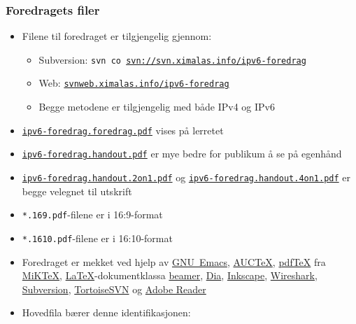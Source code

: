 \begin{frame}[allowframebreaks]
  \frametitle{Foredragets filer}
  \begin{itemize}
  \item Filene til foredraget er tilgjengelig gjennom:
    \begin{itemize}
    \item Subversion: \texttt{svn co
        \url{svn://svn.ximalas.info/ipv6-foredrag}}
    \item Web:
      \href{http://svnweb.ximalas.info/ipv6-foredrag/}{\texttt{svnweb.ximalas.info/ipv6-foredrag}}
    \item Begge metodene er tilgjengelig med både IPv4 og \alert{IPv6}
    \end{itemize}
  \item
    \href{http://svnweb.ximalas.info/ipv6-foredrag/trunk/ipv6-foredrag.foredrag.pdf?view=co}{\texttt{ipv6-foredrag.foredrag.pdf}}
    vises på lerretet
  \item
    \href{http://svnweb.ximalas.info/ipv6-foredrag/trunk/ipv6-foredrag.handout.pdf?view=co}{\texttt{ipv6-foredrag.handout.pdf}}
    er mye bedre for publikum å se på egenhånd
  \item
    \href{http://svnweb.ximalas.info/ipv6-foredrag/trunk/ipv6-foredrag.handout.2on1.pdf?view=co}{\texttt{ipv6-foredrag.handout.2on1.pdf}}
    og
    \href{http://svnweb.ximalas.info/ipv6-foredrag/trunk/ipv6-foredrag.handout.4on1.pdf?view=co}{\texttt{ipv6-foredrag.handout.4on1.pdf}}
    er begge velegnet til utskrift
  \item \texttt{*.169.pdf}-filene er i 16:9-format
  \item \texttt{*.1610.pdf}-filene er i 16:10-format
  \framebreak
  \item Foredraget er mekket ved hjelp av
    \href{http://www.gnu.org/software/emacs/}{GNU~Emacs},
    \href{http://www.gnu.org/software/auctex/}{AUC\TeX},
    \href{http://www.tug.org/applications/pdftex/}{pdf\TeX} fra
    \href{http://miktex.org/}{MiK\TeX},
    \href{http://www.latex-project.org/}{\LaTeX}-dokumentklassa
    \href{https://bitbucket.org/rivanvx/beamer/wiki/Home}{beamer},
    \href{https://wiki.gnome.org/Apps/Dia/}{Dia},
    \href{http://www.inkscape.org/en/}{Inkscape},
    \href{http://www.wireshark.org/}{Wireshark},
    \href{http://subversion.apache.org/}{Subversion},
    \href{http://tortoisesvn.net/}{TortoiseSVN} og
    \href{http://get.adobe.com/no/reader/}{Adobe Reader}
  \item Hovedfila bærer denne identifikasjonen:\\

\end{itemize}
\end{frame}

